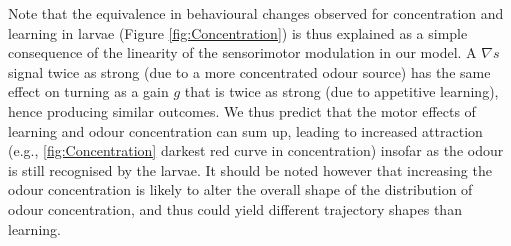 \documentclass[11pt,a4paper]{article}
\begin{document}
Note that the equivalence in behavioural changes observed for concentration and learning in larvae (Figure \ref{fig:Concentration}) is thus explained as a simple consequence of the linearity of the sensorimotor modulation in our model. A $\nabla s$ signal twice as strong (due to a more concentrated odour source) has the same effect on turning as a gain $g$ that is twice as strong (due to appetitive learning), hence producing similar outcomes. We thus predict that the motor effects of learning and odour concentration can sum up, leading to increased attraction (e.g., \ref{fig:Concentration} darkest red curve in concentration) insofar as the odour is still recognised by the larvae. It should be noted however that increasing the odour concentration is likely to alter the overall shape of the distribution of odour concentration, and thus could yield different trajectory shapes than learning.


\end{document}
